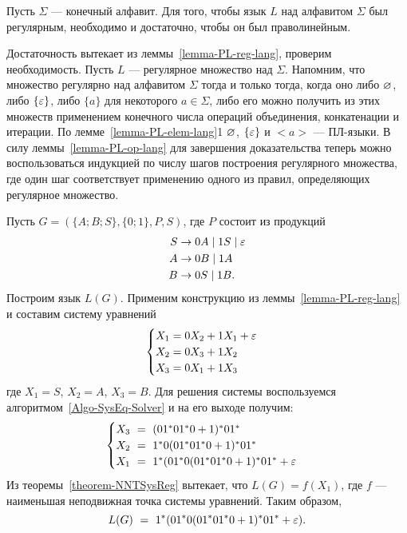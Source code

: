 \begin{mytheorem}
\label{threorem-RegExp-PL241}
Пусть $\Sigma$ --- конечный алфавит. Для того, чтобы язык $L$ над алфавитом $\Sigma$ был регулярным, необходимо и достаточно, чтобы он был праволинейным.
\end{mytheorem}

\begin{myproof}
Достаточность вытекает из леммы~\ref{lemma-PL-reg-lang}, проверим необходимость. Пусть $L$ --- регулярное множество над $\Sigma$. Напомним, что множество регулярно над алфавитом $\Sigma$ тогда и только тогда, когда оно либо $\varnothing$, либо $\{\varepsilon\}$, либо $\{a\}$ для некоторого $a\in\Sigma$, либо его можно получить из этих множеств применением конечного числа операций объединения, конкатенации и итерации. По лемме~\ref{lemma-PL-elem-lang}1 $\varnothing$, $\{\varepsilon\}$ и $<a>$ --- ПЛ-языки. В силу леммы~\ref{lemma-PL-op-lang} для завершения доказательства теперь можно воспользоваться индукцией по числу шагов построения регулярного множества, где один шаг соответствует применению одного из правил, определяющих регулярное множество.
\end{myproof}

\begin{myexample}
\label{example-FindRegLang}
Пусть $G=(\{A;B;S\},\{0;1\},P,S)$, где $P$ состоит из продукций
\begin{align*}
	S &\to 0A \mid 1S \mid \varepsilon\\
    A &\to 0B \mid 1A\\
    B &\to 0S \mid 1B.
\end{align*}
Построим язык $L(G)$. Применим конструкцию из леммы~\ref{lemma-PL-reg-lang} и составим систему уравнений
\begin{equation*}
\begin{cases}
	X_1 = 0X_2 + 1X_1 + \varepsilon \\
    X_2 = 0X_3 + 1X_2 \\
    X_3 = 0X_1 + 1X_3
\end{cases}
\end{equation*}
где $X_1=S$, $X_2=A$, $X_3=B$. Для решения системы воспользуемся алгоритмом~\ref{Algo-SysEq-Solver} и на его выходе получим:
\begin{equation*}
\begin{cases}
	X_3~=~(01^*01^*0+1)^*01^* \\
    X_2~=~1^*0(01^*01^*0+1)^*01^* \\
    X_1~=~1^*(01^*0(01^*01^*0+1)^*01^*+\varepsilon
\end{cases}
\end{equation*}
Из теоремы~\ref{theorem-NNTSysReg} вытекает, что $L(G)=f(X_1)$, где $f$ --- наименьшая неподвижная точка системы уравнений. Таким образом,
\[
	L(G)~=~1^*(01^*0(01^*01^*0+1)^*01^*+\varepsilon).
\]
\end{myexample}

